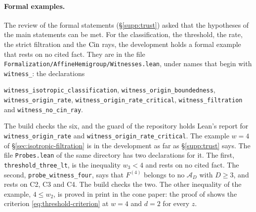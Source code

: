 \paragraph{Formal examples.} The review of the formal statements
(\S\ref{supp:trust}) asked that the hypotheses of the main statements can be met. For the
classification, the threshold, the rate, the strict filtration and the $\operatorname{Cin}$ rays, the
development holds a formal example that rests on no cited fact. They are in the file
\texttt{Formalization/AffineHemigroup/Witnesses.lean}, under names that begin with
\texttt{witness\_}: the declarations
{\raggedright \texttt{witness\_isotropic\_classification},
\texttt{witness\_origin\_boundedness}, \texttt{witness\_origin\_rate},
\texttt{witness\_origin\_rate\_critical}, \texttt{witness\_filtration} and
\texttt{witness\_no\_cin\_ray}.\par}
The build checks the six, and the guard of the repository holds Lean's report for
\texttt{witness\_origin\_rate} and \texttt{witness\_origin\_rate\_critical}.
The example $w = 4$ of \S\ref{sec:isotropic-filtration} is in the development as far as
\S\ref{supp:trust} says. The file \texttt{Probes.lean} of the same directory has two
declarations for it. The first, \texttt{threshold\_three\_lt}, is the inequality $w_3 < 4$ and
rests on no cited fact. The second, \texttt{probe\_witness\_four}, says that $F^{(4)}$ belongs
to no $\mathcal{A}_D$ with $D \ge 3$, and rests on C2, C3 and C4. The build checks the two. The
other inequality of the example,
$4 \le w_2$, is proved in print in the cone paper: the proof of  shows
the criterion \ref{eq:threshold-criterion} at $w = 4$ and $d = 2$ for every $z$.

